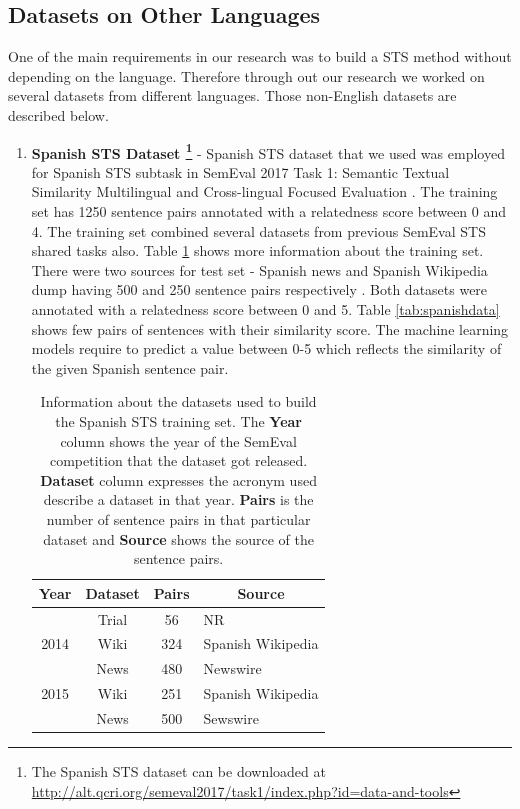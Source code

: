 \subsection{Datasets on Other Languages}
One of the main requirements in our research was to build a STS method without depending on the language. Therefore through out our research we worked on several datasets from different languages. Those non-English datasets are described below. 
  
\begin{enumerate}
\item{ \textbf{Spanish STS Dataset \footnote{The Spanish STS dataset can be downloaded at \url{http://alt.qcri.org/semeval2017/task1/index.php?id=data-and-tools}}}} - Spanish STS dataset that we used was employed for Spanish STS subtask in SemEval 2017 Task 1: Semantic Textual Similarity Multilingual and Cross-lingual Focused Evaluation \cite{cer-etal-2017-semeval}. The training set has 1250 sentence pairs annotated with a relatedness score between 0 and 4. The training set combined several datasets from previous SemEval STS shared tasks also\cite{cer-etal-2017-semeval}. Table \ref{tab:spanishdata_info} shows more information about the training set. There were two sources for test set - Spanish news and Spanish Wikipedia dump having 500 and 250 sentence pairs respectively \cite{cer-etal-2017-semeval}. Both datasets were annotated with a relatedness score between 0 and 5. Table \ref{tab:spanishdata} shows few pairs of sentences with their similarity score. The machine learning models require to predict a value between 0-5 which reflects the similarity of the given Spanish sentence pair.

\begin{table}[ht!]
	\centering
	\begin{tabular}{c|c|c|l}
		\hline
		\multicolumn{1}{c|}{\textbf{Year}} & 
		\multicolumn{1}{c|}{\textbf{Dataset}} & 
		\multicolumn{1}{c|}{\textbf{Pairs}} & 
		\multicolumn{1}{c}{\textbf{Source}} \\
		\hline
		 & Trial & 56 & NR \\
		2014 \cite{agirre-etal-2014-semeval} & Wiki  & 324 & Spanish Wikipedia \\
		 & News  & 480 & Newswire \\
		\hline
		2015 \cite{agirre-etal-2014-semeval} & Wiki & 251 & Spanish Wikipedia \\
		 & News & 500 & Sewswire \\
		\hline
	\end{tabular}
	\caption[Information about Spanish STS training set]{Information about the datasets used to build the Spanish STS training set. The \textbf{Year} column shows the year of the SemEval competition that the dataset got released. \textbf{Dataset} column expresses the acronym used describe a dataset in that year. \textbf{Pairs} is the number of sentence pairs in that particular dataset and \textbf{Source} shows the source of the sentence pairs. }
	\label{tab:spanishdata_info}
\end{table}



\end{enumerate}
